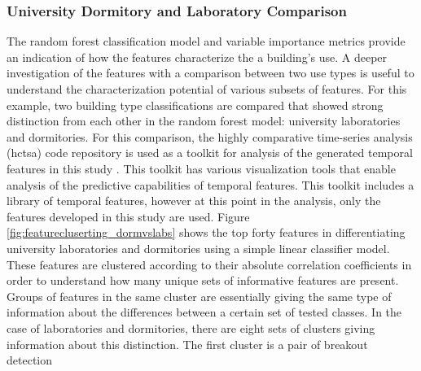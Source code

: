 \subsubsection{University Dormitory and Laboratory Comparison}
\label{sec:dormvslab}

The random forest classification model and variable importance metrics provide an indication of how the features characterize the a building's use. A deeper investigation of the features with a comparison between two use types is useful to understand the characterization potential of various subsets of features. For this example, two building type classifications are compared that showed strong distinction from each other in the random forest model: university laboratories and dormitories. For this comparison, the highly comparative time-series analysis (hctsa) code repository is used as a toolkit for analysis of the generated temporal features in this study \cite{Fulcher_2013}. This toolkit has various visualization tools that enable analysis of the predictive capabilities of temporal features. This toolkit includes a library of temporal features, however at this point in the analysis, only the features developed in this study are used. Figure \ref{fig:featurecluserting_dormvslabs} shows the top forty features in differentiating university laboratories and dormitories using a simple linear classifier model. These features are clustered according to their absolute correlation coefficients in order to understand how many unique sets of informative features are present. Groups of features in the same cluster are essentially giving the same type of information about the differences between a certain set of tested classes. In the case of laboratories and dormitories, there are eight sets of clusters giving information about this distinction. The first cluster is a pair of breakout detection